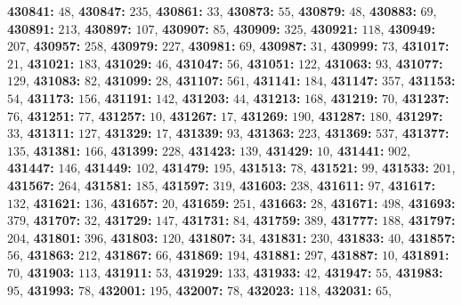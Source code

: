\textsf{\bfseries 430841:} $48$, \textsf{\bfseries 430847:} $235$, \textsf{\bfseries 430861:} $33$, \textsf{\bfseries 430873:} $55$, \textsf{\bfseries 430879:} $48$, \textsf{\bfseries 430883:} $69$, \textsf{\bfseries 430891:} $213$, \textsf{\bfseries 430897:} $107$, \textsf{\bfseries 430907:} $85$, \textsf{\bfseries 430909:} $325$, \textsf{\bfseries 430921:} $118$, \textsf{\bfseries 430949:} $207$, \textsf{\bfseries 430957:} $258$, \textsf{\bfseries 430979:} $227$, \textsf{\bfseries 430981:} $69$, \textsf{\bfseries 430987:} $31$, \textsf{\bfseries 430999:} $73$, \textsf{\bfseries 431017:} $21$, \textsf{\bfseries 431021:} $183$, \textsf{\bfseries 431029:} $46$, \textsf{\bfseries 431047:} $56$, \textsf{\bfseries 431051:} $122$, \textsf{\bfseries 431063:} $93$, \textsf{\bfseries 431077:} $129$, \textsf{\bfseries 431083:} $82$, \textsf{\bfseries 431099:} $28$, \textsf{\bfseries 431107:} $561$, \textsf{\bfseries 431141:} $184$, \textsf{\bfseries 431147:} $357$, \textsf{\bfseries 431153:} $54$, \textsf{\bfseries 431173:} $156$, \textsf{\bfseries 431191:} $142$, \textsf{\bfseries 431203:} $44$, \textsf{\bfseries 431213:} $168$, \textsf{\bfseries 431219:} $70$, \textsf{\bfseries 431237:} $76$, \textsf{\bfseries 431251:} $77$, \textsf{\bfseries 431257:} $10$, \textsf{\bfseries 431267:} $17$, \textsf{\bfseries 431269:} $190$, \textsf{\bfseries 431287:} $180$, \textsf{\bfseries 431297:} $33$, \textsf{\bfseries 431311:} $127$, \textsf{\bfseries 431329:} $17$, \textsf{\bfseries 431339:} $93$, \textsf{\bfseries 431363:} $223$, \textsf{\bfseries 431369:} $537$, \textsf{\bfseries 431377:} $135$, \textsf{\bfseries 431381:} $166$, \textsf{\bfseries 431399:} $228$, \textsf{\bfseries 431423:} $139$, \textsf{\bfseries 431429:} $10$, \textsf{\bfseries 431441:} $902$, \textsf{\bfseries 431447:} $146$, \textsf{\bfseries 431449:} $102$, \textsf{\bfseries 431479:} $195$, \textsf{\bfseries 431513:} $78$, \textsf{\bfseries 431521:} $99$, \textsf{\bfseries 431533:} $201$, \textsf{\bfseries 431567:} $264$, \textsf{\bfseries 431581:} $185$, \textsf{\bfseries 431597:} $319$, \textsf{\bfseries 431603:} $238$, \textsf{\bfseries 431611:} $97$, \textsf{\bfseries 431617:} $132$, \textsf{\bfseries 431621:} $136$, \textsf{\bfseries 431657:} $20$, \textsf{\bfseries 431659:} $251$, \textsf{\bfseries 431663:} $28$, \textsf{\bfseries 431671:} $498$, \textsf{\bfseries 431693:} $379$, \textsf{\bfseries 431707:} $32$, \textsf{\bfseries 431729:} $147$, \textsf{\bfseries 431731:} $84$, \textsf{\bfseries 431759:} $389$, \textsf{\bfseries 431777:} $188$, \textsf{\bfseries 431797:} $204$, \textsf{\bfseries 431801:} $396$, \textsf{\bfseries 431803:} $120$, \textsf{\bfseries 431807:} $34$, \textsf{\bfseries 431831:} $230$, \textsf{\bfseries 431833:} $40$, \textsf{\bfseries 431857:} $56$, \textsf{\bfseries 431863:} $212$, \textsf{\bfseries 431867:} $66$, \textsf{\bfseries 431869:} $194$, \textsf{\bfseries 431881:} $297$, \textsf{\bfseries 431887:} $10$, \textsf{\bfseries 431891:} $70$, \textsf{\bfseries 431903:} $113$, \textsf{\bfseries 431911:} $53$, \textsf{\bfseries 431929:} $133$, \textsf{\bfseries 431933:} $42$, \textsf{\bfseries 431947:} $55$, \textsf{\bfseries 431983:} $95$, \textsf{\bfseries 431993:} $78$, \textsf{\bfseries 432001:} $195$, \textsf{\bfseries 432007:} $78$, \textsf{\bfseries 432023:} $118$, \textsf{\bfseries 432031:} $65$, 
